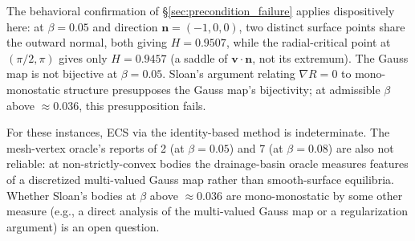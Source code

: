 \documentclass[11pt,a4paper]{article}
\begin{document}
The behavioral confirmation of \S\ref{sec:precondition_failure}
applies dispositively here: at $\beta = 0.05$ and direction
$\mathbf{n} = (-1, 0, 0)$, two distinct surface points share the
outward normal, both giving $H = 0.9507$, while the radial-critical
point at $(\pi/2, \pi)$ gives only $H = 0.9457$ (a saddle of
$\mathbf{v}\cdot\mathbf{n}$, not its extremum). The Gauss map is
not bijective at $\beta = 0.05$. Sloan's argument relating
$\nabla R = 0$ to mono-monostatic structure presupposes the Gauss
map's bijectivity; at admissible $\beta$ above $\approx 0.036$, this
presupposition fails.

For these instances, ECS via the identity-based method is
indeterminate. The mesh-vertex oracle's reports of 2 (at $\beta=0.05$)
and 7 (at $\beta=0.08$) are also not reliable: at non-strictly-convex
bodies the drainage-basin oracle measures features of a discretized
multi-valued Gauss map rather than smooth-surface equilibria.
Whether Sloan's bodies at $\beta$ above $\approx 0.036$ are
mono-monostatic by some other measure (e.g., a direct analysis of the multi-valued Gauss map
or a regularization argument) is an open question.
\end{document}
